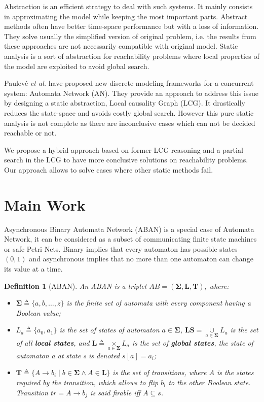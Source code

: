 \documentclass[en]{jdoc}
\newtheorem{definition}{Definition}
\newcommand{\acm}[3]{#1\rightarrow#2}
\begin{document}
Abstraction is an efficient strategy to deal with such systems. It mainly consists in approximating the model while keeping the most important parts.
Abstract methods often have better time-space performance but with a loss of information. They solve usually the simplified version of original problem, i.e. the results from these approaches are not necessarily compatible with original model.
Static analysis is a sort of abstraction for reachability problems where local properties of the model are exploited to avoid global search. 

Paulev\'e \textit{et al.} \cite{folschette2015,pauleve2012} have proposed new discrete modeling frameworks for a concurrent system: Automata Network (AN). They provide an approach to address this issue by designing a static abstraction, Local causality Graph (LCG). It drastically reduces the state-space and avoids costly global search. However this pure static analysis is not complete as there are inconclusive cases which can not be decided reachable or not.


We propose a hybrid approach based on former LCG reasoning and a partial search in the LCG to have more conclusive solutions on reachability problems. Our approach allows to solve cases where other static methods fail.
\section{Main Work}
Asynchronous Binary Automata Network (ABAN) is a special case of Automata Network, it can be considered as a subset of communicating finite state machines or safe Petri Nets. Binary implies that every automaton has possible states $(0,1)$ and asynchronous implies that no more than one automaton can change its value at a time.

\begin{definition}[ABAN]
An ABAN is a triplet $AB = (\mathbf{\Sigma},\mathbf{L},\mathbf{T})$, where:
\begin{itemize}
\item $\mathbf{\Sigma}\triangleq\{a,b,\ldots,z\}$ is the finite set of automata with every component having a Boolean value;
\item $L_a\triangleq\{a_0,a_1\}$ is the set of states of automaton $a\in \mathbf{\Sigma}$, $\mathbf{LS}=\underset{a\in \mathbf{\Sigma}}{\cup} L_a$ is the set of all \textbf{local states}, and $\mathbf{L}\triangleq \underset{a\in \mathbf{\Sigma}}{\times} L_a$ is the set of \textbf{global states}, the state of automaton a at state s is denoted $s[a]=a_i$;
\item $\mathbf{T}\triangleq \{A\rightarrow b_i\mid b\in \mathbf{\Sigma} \land A\in \mathbf{L}\}$ is the set of transitions, where $A$ is the states required by the transition, which allows to flip $b_i$ to the other Boolean state. Transition $tr=\acm{A}{b_j}{b_k}$ is said firable iff $A\subseteq s$.%
\end{itemize}
\end{definition}
\end{document}
